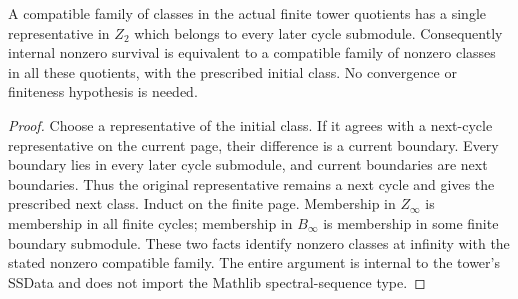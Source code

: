 \begin{proposition}
  \label{prop:h6-tower-common-representative}
  \leanok
  A compatible family of classes in the actual finite tower quotients
  has a single representative in $Z_2$ which belongs to every later cycle
  submodule. Consequently internal nonzero survival is equivalent to a
  compatible family of nonzero classes in all these quotients, with the
  prescribed initial class. No convergence or finiteness hypothesis is needed.
\end{proposition}
\begin{proof}
  Choose a representative of the initial class. If it agrees with a
  next-cycle representative on the current page, their difference is a
  current boundary. Every boundary lies in every later cycle submodule,
  and current boundaries are next boundaries. Thus the original representative
  remains a next cycle and gives the prescribed next class. Induct on the
  finite page. Membership in $Z_\infty$ is membership in all finite cycles;
  membership in $B_\infty$ is membership in some finite boundary submodule.
  These two facts identify nonzero classes at infinity with the stated
  nonzero compatible family. The entire argument is internal to the tower's
  SSData and does not import the Mathlib spectral-sequence type.
  \leanok
\end{proof}
